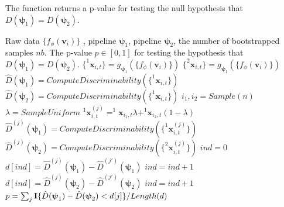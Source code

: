 \documentclass[simplex.tex]{subfiles}
\providecommand{\mb}[1]{\boldsymbol{#1}}
\providecommand{\ve}[1]{\boldsymbol{#1}}
\newcommand{\bpsi}{\ve{\psi}}
\newcommand{\bv}{\mb{v}}
\newcommand{\bx}{\mb{x}}
\begin{document}
\begin{algorithm}               
	\caption{The function returns a p-value for testing the null hypothesis that $D(\bpsi_1)=D(\bpsi_2)$.  }   
	\label{alg:tst}                       
	\begin{algorithmic}                    
		\Require Raw data $\{f_\phi(\bv_i)\}$ , pipeline $\bpsi_1$, pipeline $\bpsi_2$, the number of bootstrapped samples $nb$.
		\Ensure The p-value $p \in [0,1]$ for testing the hypothesis that $D(\bpsi_1)=D(\bpsi_2)$. 
		\State $\{^1\bx_{i,t}\}= g_{\bpsi_1}(\{f_\phi(\bv_i)\})$ 
		\State $\{^2\bx_{i,t}\}= g_{\bpsi_1}(\{f_\phi(\bv_i)\})$ 
		\State $\hat{D}(\bpsi_1)=ComputeDiscriminability(\{^1\bx_{i,t}\})$
		\State $\hat{D}(\bpsi_2)=ComputeDiscriminability(\{^1\bx_{i,t}\})$ 
		\State $i_1, i_2 = Sample(n)$ 
		\State $\lambda = SampleUniform$ 
		\State $^1\bx^{(j)}_{i,t} =  ^1\bx_{i_1,t} \lambda +   ^1\bx_{i_2,t}(1-\lambda)$ 
		\EndFor
		\EndFor
		\State $\hat{D}^{(j)}(\bpsi_1)=ComputeDiscriminability(\{^1\bx^{(j)}_{i,t}\})$
		\State $\hat{D}^{(j)}(\bpsi_2)=ComputeDiscriminability(\{^2\bx^{(j)}_{i,t}\})$
		\EndFor
		\State $ind = 0$
		 
		\State $d[ind] =  \hat{D}^{(j)}(\bpsi_1)-\hat{D}^{(j')}(\bpsi_1)$ 
		\State $ind = ind + 1$
		\State $d[ind] =  \hat{D}^{(j)}(\bpsi_2)-\hat{D}^{(j')}(\bpsi_2)$
		\State $ind = ind + 1$
		\EndFor
		\EndFor
		\State $p = \sum_j {\bf I}\{\hat{D}(\bpsi_1)-\hat{D}(\bpsi_2) < d[j]\} / Length(d)$ 
		\EndFunction
	\end{algorithmic}
\end{algorithm}


  
\end{document}
